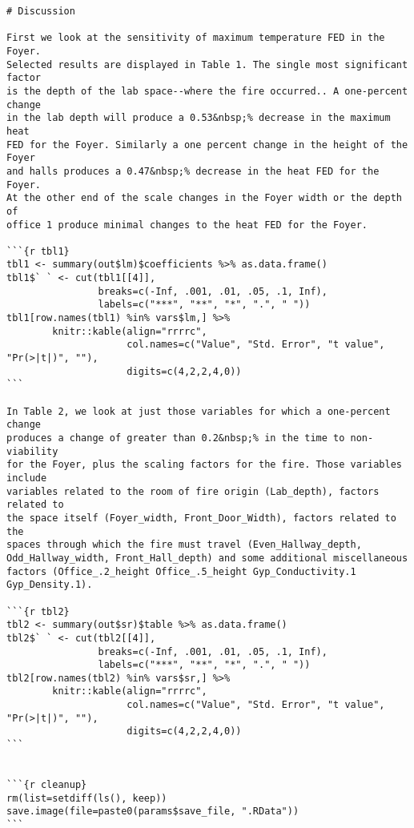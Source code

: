 \begin{lstlisting}[basicstyle=\scriptsize]
# Discussion

First we look at the sensitivity of maximum temperature FED in the Foyer.
Selected results are displayed in Table 1. The single most significant factor
is the depth of the lab space--where the fire occurred.. A one-percent change
in the lab depth will produce a 0.53&nbsp;% decrease in the maximum heat
FED for the Foyer. Similarly a one percent change in the height of the Foyer
and halls produces a 0.47&nbsp;% decrease in the heat FED for the Foyer.
At the other end of the scale changes in the Foyer width or the depth of
office 1 produce minimal changes to the heat FED for the Foyer.

```{r tbl1}
tbl1 <- summary(out$lm)$coefficients %>% as.data.frame()
tbl1$` ` <- cut(tbl1[[4]],
                breaks=c(-Inf, .001, .01, .05, .1, Inf),
                labels=c("***", "**", "*", ".", " "))
tbl1[row.names(tbl1) %in% vars$lm,] %>%
        knitr::kable(align="rrrrc",
                     col.names=c("Value", "Std. Error", "t value", "Pr(>|t|)", ""),
                     digits=c(4,2,2,4,0))
```

In Table 2, we look at just those variables for which a one-percent change
produces a change of greater than 0.2&nbsp;% in the time to non-viability
for the Foyer, plus the scaling factors for the fire. Those variables include
variables related to the room of fire origin (Lab_depth), factors related to
the space itself (Foyer_width, Front_Door_Width), factors related to the
spaces through which the fire must travel (Even_Hallway_depth,
Odd_Hallway_width, Front_Hall_depth) and some additional miscellaneous
factors (Office_.2_height Office_.5_height Gyp_Conductivity.1 Gyp_Density.1).

```{r tbl2}
tbl2 <- summary(out$sr)$table %>% as.data.frame()
tbl2$` ` <- cut(tbl2[[4]],
                breaks=c(-Inf, .001, .01, .05, .1, Inf),
                labels=c("***", "**", "*", ".", " "))
tbl2[row.names(tbl2) %in% vars$sr,] %>%
        knitr::kable(align="rrrrc",
                     col.names=c("Value", "Std. Error", "t value", "Pr(>|t|)", ""),
                     digits=c(4,2,2,4,0))
```


```{r cleanup}
rm(list=setdiff(ls(), keep))
save.image(file=paste0(params$save_file, ".RData"))
```
\end{lstlisting}
